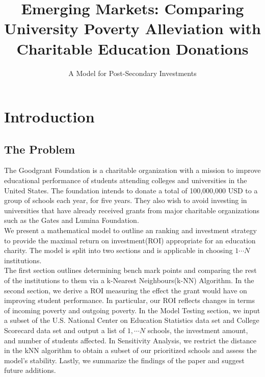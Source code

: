 \documentclass[12pt]{scrartcl}
\title{Emerging Markets: Comparing University Poverty Alleviation with Charitable Education Donations}
\subtitle{A Model for Post-Secondary Investments}
\begin{document}
\maketitle
\newpage
\tableofcontents
\newpage
\setcounter{page}{1}	

\section{Introduction}
	\subsection{The Problem}
		The Goodgrant Foundation is a charitable organization with a mission to improve educational performance of students attending colleges and universities in the United States. The foundation intends to donate a total of 100,000,000 USD to a group of schools each year, for five years. They also wish to avoid investing in universities that have already received grants from major charitable organizations such as the Gates and Lumina Foundation.\\
		
		We present a mathematical model to outline an ranking and investment strategy to provide the maximal return on investment(ROI) appropriate for an education charity.  The model is split into two sections and is applicable in choosing $1\cdots N$ institutions. \\

The first section outlines determining bench mark points and comparing the rest of the institutions to them via a k-Nearest Neighbours(k-NN) Algorithm. In the second section, we derive a ROI measuring the effect the grant would have on improving student performance. In particular, our ROI reflects changes in terms of incoming poverty and outgoing poverty. In the Model Testing section, we input a subset of the U.S. National Center on Education Statistics data set and College Scorecard data set and output a list of $1,\cdots{N}$ schools, the investment amount, and number of students affected. In Sensitivity Analysis, we restrict the distance in the kNN algorithm to obtain a subset of our prioritized schools and assess the model's stability. Lastly, we summarize the findings of the paper and suggest future additions. 
	
\end{document}

